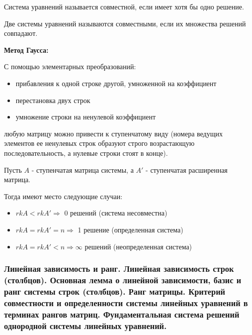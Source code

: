 \documentclass{article}
\begin{document}
Система уравнений называется совместной, если имеет хотя бы одно решение.

Две системы уравнений называются совместными, если их множества решений совпадают.

\textbf{Метод Гаусса:}

С помощью элементарных преобразований:
\begin{itemize}
    \item прибавления к одной строке другой, умноженной на коэффициент
    \item перестановка двух строк
    \item умножение строки на ненулевой коэффициент
\end{itemize}
любую матрицу можно привести к ступенчатому виду (номера ведущих элементов
ее ненулевых строк образуют строго возрастающую последовательность, а
нулевые строки стоят в конце).

Пусть $A$ - ступенчатая матрица системы, а $A'$ - ступенчатая расширенная матрица.

Тогда имеют место следующие случаи:
\begin{itemize}
    \item $rk A < rk A' \Rightarrow$ 0 решений (система несовместна)
    \item $rk A = rk A' = n \Rightarrow$ 1 решение (определенная система)
    \item $rk A = rk A' < n \Rightarrow \infty$ решений (неопределенная система)
\end{itemize}




\subsubsection{Линейная зависимость и ранг. Линейная зависимость строк (столбцов). Основная лемма
о линейной зависимости, базис и ранг системы строк (столбцов). Ранг матрицы.
Критерий совместности и определенности системы линейных уравнений в терминах
рангов матриц. Фундаментальная система решений однородной системы линейных
уравнений.}
\end{document}
